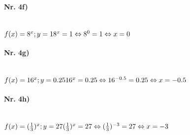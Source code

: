 \documentclass[12pt, a4paper]{report}
\begin{document}
	\paragraph{Nr. 4f)} \mbox{} \\
	$
	f(x) = 8^x; y = 1 \\
	8^x = 1 \\
	\Leftrightarrow 8^0 = 1 \\
	\Leftrightarrow x = 0
	$
	\paragraph{Nr. 4g)} \mbox{} \\
	$
	f(x) = 16^x; y = 0.25 \\
	16^x = 0.25\\
	\Leftrightarrow 16^{-0.5} = 0.25 \\
	\Leftrightarrow x = -0.5
	$
	\paragraph{Nr. 4h)} \mbox{} \\
	$
	f(x) = (\frac{1}{3})^x; y = 27 \\
	(\frac{1}{3})^x = 27 \\
	\Leftrightarrow (\frac{1}{3})^{-3} = 27 \\
	\Leftrightarrow x = -3
	$
	
\end{document}
